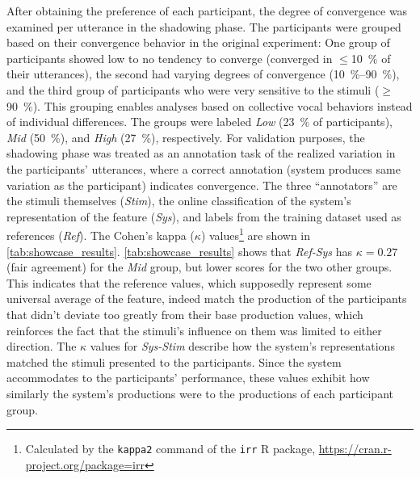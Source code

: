 %
After obtaining the preference of each participant, the degree of convergence was examined per utterance in the shadowing phase.
The participants were grouped based on their convergence behavior in the original experiment:
One group of participants showed low to no tendency to converge (converged in $\le$\SI{10}{\percent} of their utterances),
the second had varying degrees of convergence (\SIrange{10}{90}{\percent}),
and the third group of participants who were very sensitive to the stimuli ($\ge$\SI{90}{\percent}).
This grouping enables analyses based on collective vocal behaviors instead of individual differences.
The groups were labeled \emph{Low} (\SI{23}{\percent} of participants), \emph{Mid} (\SI{50}{\percent}), and \emph{High} (\SI{27}{\percent}), respectively.
For validation purposes, the shadowing phase was treated as an annotation task of the realized variation in the participants' utterances, where a correct annotation (system produces same variation as the participant) indicates convergence.
The three \enquote{annotators} are the stimuli themselves (\emph{Stim}), the online classification of the system's representation of the feature (\emph{Sys}), and labels from the training dataset used as references (\emph{Ref}).
The Cohen's kappa ($\kappa$) values\footnote{Calculated by the \texttt{kappa2} command of the \texttt{irr} R package, \url{https://cran.r-project.org/package=irr}} are shown in \cref{tab:showcase_results}.
\cref{tab:showcase_results} shows that \emph{Ref-Sys} has $\kappa = 0.27$ (fair agreement) for the \emph{Mid} group, but lower scores for the two other groups.
This indicates that the reference values, which supposedly represent some universal average of the feature, indeed match the production of the participants that didn't deviate too greatly from their base production values, which reinforces the fact that the stimuli's influence on them was limited to either direction.
The $\kappa$ values for \emph{Sys-Stim} describe how the system's representations matched the stimuli presented to the participants.
Since the system accommodates to the participants' performance, these values exhibit how similarly the system's productions were to the productions of each participant group.
